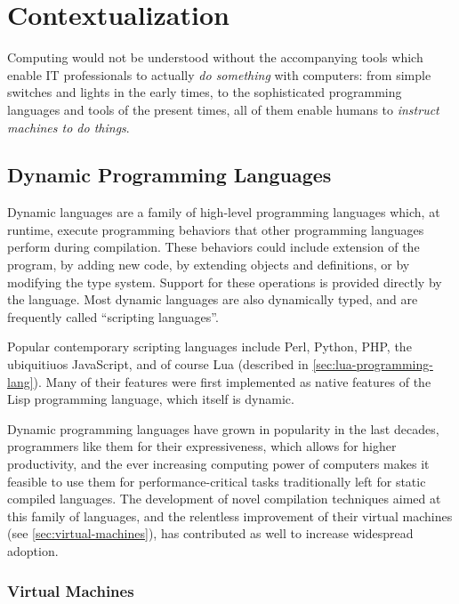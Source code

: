 
\chapter{Contextualization}

Computing would not be understood without the accompanying tools which enable
IT professionals to actually \emph{do something} with computers: from simple
switches and lights in the early times, to the sophisticated programming
languages and tools of the present times, all of them enable humans to
\emph{instruct machines to do things}.


\section{Dynamic Programming Languages}

Dynamic languages are a family of high-level programming languages which,
at runtime, execute programming behaviors that other programming languages
perform during compilation. These behaviors could include extension of the
program, by adding new code, by extending objects and definitions, or by
modifying the type system. Support for these operations is provided
directly by the language. Most dynamic languages are also dynamically
typed, and are frequently called “scripting languages”.

Popular contemporary scripting languages include Perl, Python, PHP, the
ubiquitiuos JavaScript, and of course Lua (described in
\autoref{sec:lua-programming-lang}). Many of their features were first
implemented as native features of the Lisp programming language, which itself
is dynamic.

Dynamic programming languages have grown in popularity in the last decades,
programmers like them for their expressiveness, which allows for higher
productivity, and the ever increasing computing power of computers makes it
feasible to use them for performance-critical tasks traditionally left for
static compiled languages. The development of novel compilation techniques
aimed at this family of languages, and the relentless improvement of their
virtual machines (see \autoref{sec:virtual-machines}), has contributed as well
to increase widespread adoption.

\subsection{Virtual Machines}
	\label{sec:virtual-machines}


